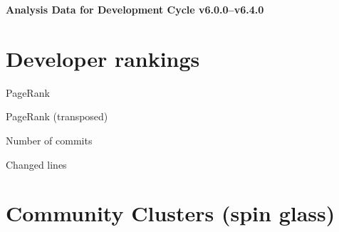 \documentclass{article}
\begin{document}
\setlength{\parindent}{0pt}
\begin{center}
\begin{Large}
\textbf{Analysis Data for Development Cycle v6.0.0--v6.4.0}
\end{Large}
\end{center}
\section{Developer rankings}
\begin{small}\renewcommand{\tabcolsep}{1pt}
\begin{minipage}{0.5\linewidth}
PageRank\\

\end{minipage}%
\begin{minipage}{0.5\linewidth}
PageRank (transposed)\\

\end{minipage}

\renewcommand{\tabcolsep}{5pt}
\begin{minipage}{0.5\linewidth}
Number of commits\\

\end{minipage}%
\begin{minipage}{0.5\linewidth}
Changed lines\\

\end{minipage}
\end{small}
\newpage\section{Community Clusters (spin glass)}
\end{document}
